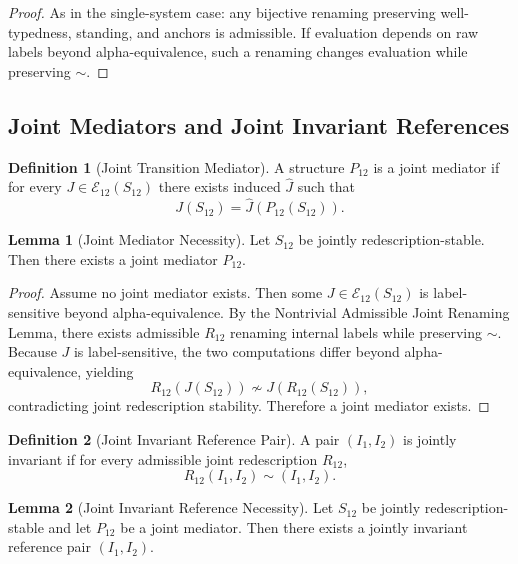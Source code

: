 \documentclass[11pt]{article}
\theoremstyle{definition}
\newtheorem{definition}{Definition}
\newtheorem{lemma}{Lemma}
\begin{document}
\begin{proof}
As in the single-system case: any bijective renaming preserving well-typedness, standing, and anchors is admissible.
If evaluation depends on raw labels beyond alpha-equivalence, such a renaming changes evaluation while preserving $\sim$.
\end{proof}

\subsection{Joint Mediators and Joint Invariant References}

\begin{definition}[Joint Transition Mediator]
A structure $P_{12}$ is a joint mediator if for every $J\in\mathcal{E}_{12}(S_{12})$ there exists induced $\widehat{J}$ such that
\[
J(S_{12})=\widehat{J}(P_{12}(S_{12})).
\]
\end{definition}

\begin{lemma}[Joint Mediator Necessity]
Let $S_{12}$ be jointly redescription-stable. Then there exists a joint mediator $P_{12}$.
\end{lemma}

\begin{proof}
Assume no joint mediator exists. Then some $J\in\mathcal{E}_{12}(S_{12})$ is label-sensitive beyond alpha-equivalence.
By the Nontrivial Admissible Joint Renaming Lemma, there exists admissible $R_{12}$ renaming internal labels while preserving $\sim$.
Because $J$ is label-sensitive, the two computations differ beyond alpha-equivalence, yielding
\[
R_{12}(J(S_{12}))\not\sim J(R_{12}(S_{12})),
\]
contradicting joint redescription stability. Therefore a joint mediator exists.
\end{proof}

\begin{definition}[Joint Invariant Reference Pair]
A pair $(I_1,I_2)$ is jointly invariant if for every admissible joint redescription $R_{12}$,
\[
R_{12}(I_1,I_2)\sim (I_1,I_2).
\]
\end{definition}

\begin{lemma}[Joint Invariant Reference Necessity]
Let $S_{12}$ be jointly redescription-stable and let $P_{12}$ be a joint mediator. Then there exists a jointly invariant reference pair $(I_1,I_2)$.
\end{lemma}
\end{document}
